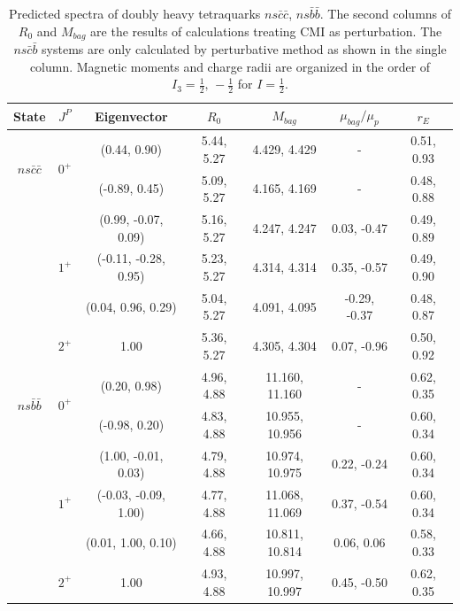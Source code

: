 \documentclass[prt,twocolumn,floatfix,nofootinbib]{revtex4}
\begin{document}
\renewcommand{\tabcolsep}{0.28cm}
\renewcommand{\arraystretch}{1.2}
\begin{table}[!htbp]
    \caption{Predicted spectra of doubly heavy tetraquarks $ns\bar{c}\bar{c}$, $ns\bar{b}\bar{b}$.
    The second columns of $R_{0}$ and $M_{bag}$ are the results of calculations treating CMI as perturbation.
    The $ns\bar{c}\bar{b}$ systems are only calculated by perturbative method as shown in the single column.
    Magnetic moments and charge radii are organized in the order of $I_{3}=\frac{1}{2},\,-\frac{1}{2}$ for $I=\frac{1}{2}$.}
    \label{tab:2heavytetraquark1/2}
    \begin{tabular}{ccccccc}
        \hline\hline
        {\rm State}     &$J^{P}$    &{\rm Eigenvector}      &$R_{0}$        &$M_{bag}$          &$\mu_{bag}/\mu_{p}$    &$r_{E}$ \\ \hline
        \multirow{2}{*}{$ns\bar{c}\bar{c}$}
                        &\multirow{2}{*}{$0^{+}$}
                                    &(0.44, 0.90)           &5.44, 5.27	    &4.429, 4.429	    &-                      &0.51, 0.93 \\
                        &           &(-0.89, 0.45)          &5.09, 5.27	    &4.165, 4.169	    &-                      &0.48, 0.88 \\
                        &\multirow{3}{*}{$1^{+}$}
                                    &(0.99, -0.07, 0.09)    &5.16, 5.27	    &4.247, 4.247	    &0.03, -0.47            &0.49, 0.89 \\
                        &           &(-0.11, -0.28, 0.95)   &5.23, 5.27	    &4.314, 4.314	    &0.35, -0.57            &0.49, 0.90 \\
                        &           &(0.04, 0.96, 0.29)     &5.04, 5.27	    &4.091, 4.095	    &-0.29, -0.37           &0.48, 0.87 \\
                        &$2^{+}$    &1.00                   &5.36, 5.27	    &4.305, 4.304	    &0.07, -0.96            &0.50, 0.92 \\
        \multirow{2}{*}{$ns\bar{b}\bar{b}$}
                        &\multirow{2}{*}{$0^{+}$}
                                    &(0.20, 0.98)           &4.96, 4.88	    &11.160, 11.160	    &-                      &0.62, 0.35 \\
                        &           &(-0.98, 0.20)          &4.83, 4.88	    &10.955, 10.956	    &-                      &0.60, 0.34 \\
                        &\multirow{3}{*}{$1^{+}$}
                                    &(1.00, -0.01, 0.03)    &4.79, 4.88	    &10.974, 10.975	    &0.22, -0.24            &0.60, 0.34 \\
                        &           &(-0.03, -0.09, 1.00)   &4.77, 4.88	    &11.068, 11.069	    &0.37, -0.54            &0.60, 0.34 \\
                        &           &(0.01, 1.00, 0.10)     &4.66, 4.88	    &10.811, 10.814	    &0.06, 0.06             &0.58, 0.33 \\
                        &$2^{+}$    &1.00                   &4.93, 4.88	    &10.997, 10.997	    &0.45, -0.50            &0.62, 0.35 \\


\end{tabular}
\end{table}
\end{document}
